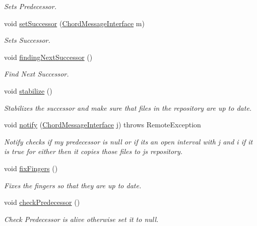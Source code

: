 \begin{DoxyCompactItemize}
\begin{DoxyCompactList}\small\item\em Sets Predecessor. \end{DoxyCompactList}\item 
void \hyperlink{class_chord_a7de61846981d5fd1b7a9b8a6c653dc76}{set\+Successor} (\hyperlink{interface_chord_message_interface}{Chord\+Message\+Interface} m)
\begin{DoxyCompactList}\small\item\em Sets Successor. \end{DoxyCompactList}\item 
void \hyperlink{class_chord_a65c855dc1d8c6a82545899cb823dba2e}{finding\+Next\+Successor} ()
\begin{DoxyCompactList}\small\item\em Find Next Successor. \end{DoxyCompactList}\item 
void \hyperlink{class_chord_a8a4b7a1cd88cb3f607ada0629f2ff2dd}{stabilize} ()
\begin{DoxyCompactList}\small\item\em Stabilizes the successor and make sure that files in the repository are up to date. \end{DoxyCompactList}\item 
void \hyperlink{class_chord_a4de8b8464782dd96d88deeb35b2f27a2}{notify} (\hyperlink{interface_chord_message_interface}{Chord\+Message\+Interface} j)  throws Remote\+Exception 
\begin{DoxyCompactList}\small\item\em Notify checks if my predecessor is null or if its an open interval with j and i if it is true for either then it copies those files to j\textquotesingle{}s repository. \end{DoxyCompactList}\item 
void \hyperlink{class_chord_a02763f74bbd986baa7e6567bf9dc3c95}{fix\+Fingers} ()
\begin{DoxyCompactList}\small\item\em Fixes the fingers so that they are up to date. \end{DoxyCompactList}\item 
void \hyperlink{class_chord_a530b2ab58c9f4026dadf4293c38c4450}{check\+Predecessor} ()
\begin{DoxyCompactList}\small\item\em Check Predecessor is alive otherwise set it to null. \end{DoxyCompactList}\item 

\end{DoxyCompactItemize}
